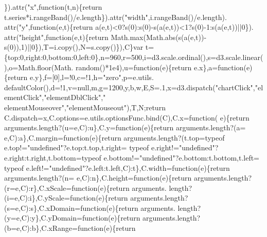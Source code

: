 \begin{DoxyCode}
{      \}).attr(\textcolor{stringliteral}{"x"},\textcolor{keyword}{function}(t,n)\{\textcolor{keywordflow}{return} t.series*i.rangeBand()/e.length\}).attr(\textcolor{stringliteral}{"width"},i.rangeBand()/e.length).
      attr(\textcolor{stringliteral}{"y"},\textcolor{keyword}{function}(e,t)\{\textcolor{keywordflow}{return} a(e,t)<0?s(0):s(0)-s(a(e,t))<1?s(0)-1:s(a(e,t))||0\}).
      attr(\textcolor{stringliteral}{"height"},function(e,t)\{\textcolor{keywordflow}{return} Math.max(Math.abs(s(a(e,t))-s(0)),1)||0\}),T=i.copy(),N=s.copy()\}),C\}var 
      t=\{top:0,right:0,bottom:0,left:0\},n=960,r=500,i=d3.scale.ordinal(),s=d3.scale.linear(),o=Math.floor(Math.
      random()*1e4),u=\textcolor{keyword}{function}(e)\{\textcolor{keywordflow}{return} e.x\},a=\textcolor{keyword}{function}(e)\{\textcolor{keywordflow}{return} e.y\},f=[0],l=!0,c=!1,h=\textcolor{stringliteral}{"zero"},p=e.utils.
      defaultColor(),d=!1,v=null,m,g=1200,y,b,w,E,S=.1,x=d3.dispatch(\textcolor{stringliteral}{"chartClick"},\textcolor{stringliteral}{"elementClick"},\textcolor{stringliteral}{"elementDblClick"},\textcolor{stringliteral}{"
      elementMouseover"},\textcolor{stringliteral}{"elementMouseout"}),T,N;\textcolor{keywordflow}{return} C.dispatch=x,C.options=e.utils.optionsFunc.bind(C),C.x=\textcolor{keyword}{function}(
      e)\{\textcolor{keywordflow}{return} arguments.length?(u=e,C):u\},C.y=\textcolor{keyword}{function}(e)\{\textcolor{keywordflow}{return} arguments.length?(a=
      e,C):a\},C.margin=\textcolor{keyword}{function}(e)\{\textcolor{keywordflow}{return} arguments.length?(t.top=typeof e.top!=\textcolor{stringliteral}{"undefined"}?e.top:t.top,t.right=
      typeof e.right!=\textcolor{stringliteral}{"undefined"}?e.right:t.right,t.bottom=typeof e.bottom!=\textcolor{stringliteral}{"undefined"}?e.bottom:t.bottom,t.left=
      typeof e.left!=\textcolor{stringliteral}{"undefined"}?e.left:t.left,C):t\},C.width=\textcolor{keyword}{function}(e)\{\textcolor{keywordflow}{return} arguments.length?(n=
      e,C):n\},C.height=\textcolor{keyword}{function}(e)\{\textcolor{keywordflow}{return} arguments.length?(r=e,C):r\},C.xScale=\textcolor{keyword}{function}(e)\{\textcolor{keywordflow}{return} arguments.
      length?(i=e,C):i\},C.yScale=\textcolor{keyword}{function}(e)\{\textcolor{keywordflow}{return} arguments.length?(s=e,C):s\},C.xDomain=\textcolor{keyword}{function}(e)\{\textcolor{keywordflow}{return} arguments.
      length?(y=e,C):y\},C.yDomain=\textcolor{keyword}{function}(e)\{\textcolor{keywordflow}{return} arguments.length?(b=e,C):b\},C.xRange=\textcolor{keyword}{function}(e)\{\textcolor{keywordflow}{return} 
}
\end{DoxyCode}
